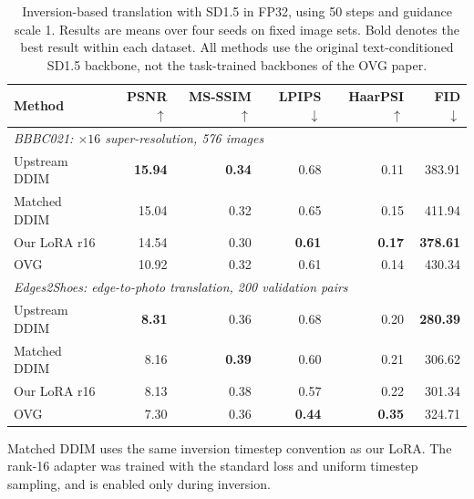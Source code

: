 \documentclass[11pt]{article}
\begin{document}
\begin{table}[htbp]
  \centering
  \small
  \setlength{\tabcolsep}{5pt}
  \caption{Inversion-based translation with SD1.5 in FP32, using 50 steps
  and guidance scale 1. Results are means over four seeds on fixed image
  sets. Bold denotes the best result within each dataset. All methods use
  the original text-conditioned SD1.5 backbone, not the task-trained
  backbones of the OVG paper.}
  \label{tab:ovg-transfer-four-seed}
  \begin{tabular}{lrrrrr}
    \toprule
    Method & PSNR $\uparrow$ & MS-SSIM $\uparrow$ & LPIPS $\downarrow$
           & HaarPSI $\uparrow$ & FID $\downarrow$ \\
    \midrule
    \multicolumn{6}{l}{\textit{BBBC021: $\times 16$ super-resolution, 576 images}} \\
    \addlinespace[2pt]
    Upstream DDIM & \textbf{15.94} & \textbf{0.34} & 0.68 & 0.11 & 383.91 \\
    Matched DDIM  & 15.04 & 0.32 & 0.65 & 0.15 & 411.94 \\
    Our LoRA r16  & 14.54 & 0.30 & \textbf{0.61} & \textbf{0.17} & \textbf{378.61} \\
    OVG           & 10.92 & 0.32 & 0.61 & 0.14 & 430.34 \\
    \midrule
    \multicolumn{6}{l}{\textit{Edges2Shoes: edge-to-photo translation, 200 validation pairs}} \\
    \addlinespace[2pt]
    Upstream DDIM & \textbf{8.31} & 0.36 & 0.68 & 0.20 & \textbf{280.39} \\
    Matched DDIM  & 8.16 & \textbf{0.39} & 0.60 & 0.21 & 306.62 \\
    Our LoRA r16  & 8.13 & 0.38 & 0.57 & 0.22 & 301.34 \\
    OVG           & 7.30 & 0.36 & \textbf{0.44} & \textbf{0.35} & 324.71 \\
    \bottomrule
  \end{tabular}

  \smallskip
  \begin{minipage}{0.95\linewidth}
    \footnotesize
    Matched DDIM uses the same inversion timestep convention as our LoRA.
    The rank-16 adapter was trained with the standard loss and uniform
    timestep sampling, and is enabled only during inversion.
  \end{minipage}
\end{table}
\end{document}
